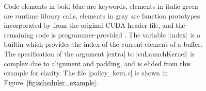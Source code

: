 \begin{figure}
{Code elements in {\lapiskeywordstyle bold blue} are \Lapis keywords, elements in {\lapisstdlibstyle italic green} are runtime library calls,
elements in {\lapisprototypestyle gray} are function prototypes incorporated by \CAvA from the original CUDA header file,
and the remaining code is programmer-provided \Lapis.
The variable \spec|index| is a \Lapis builtin which provides the index of the current element of a buffer.
The specification of the argument \spec|extra| to \spec|cuLaunchKernel| is complex due to alignment and padding, and is elided from this example for clarity.
The file \spec|policy_kern.c| is shown in Figure~\ref{fig:scheduler_example}.
}
\label{fig:lapis-values-example}
\label{fig:spec_example}
\vspace*{-0.5em}
\end{figure}
